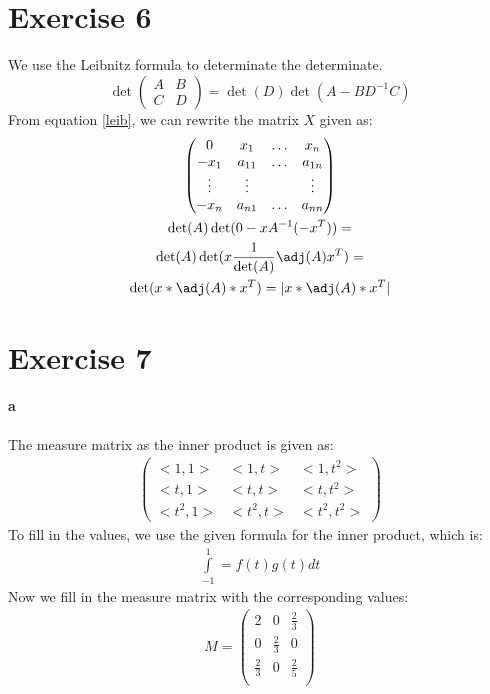 \section{Exercise 6}
We use the Leibnitz formula to determinate the determinate.
\begin{equation}
\label{leib}
\det\begin{pmatrix}A& B\\ C& D\end{pmatrix} = \det(D) \det(A - B D^{-1} C)
\end{equation}
From equation \ref{leib}, we can rewrite the matrix $X$ given as:
\begin{gather*}
\begin{pmatrix}
0& x_1 & \hdots & x_n \\
-x_1 & a_{11} & \hdots & a_{1n}\\
\vdots & \vdots	& & \vdots\\
-x_n & a_{n1} & \hdots & a_{nn} 
\end{pmatrix}  \\
\det(A) \det(0 - x A^{-1} (-x^T)) =\\
\det(A) \det( x \frac{1}{\det(A)} \adj(A) x^T) =\\
\det(x*\adj(A)*x^{T}) = | x*\adj(A)*x^{T} |
\end{gather*}

\section{Exercise 7}
\paragraph*{a}
The measure matrix as the inner product is given as: 
\begin{gather*}
\left( \begin{array}{ccc}
<1,1> & <1,t> & <1,t^2> \\
<t,1> & <t,t> & <t,t^2>\\
<t^2,1> & <t^2,t> & <t^2,t^2>
\end{array} \right)
\end{gather*}
To fill in the values, we use the given formula for the inner product, which is:
\begin{gather*}
\int\limits_{-1}^{1} = f(t)g(t) dt
\end{gather*}
Now we fill in the measure matrix with the corresponding values:
\begin{gather}
\label{measure}
M = \left( \begin{array}{ccc}
2 & 0 & \frac{2}{3} \\
0 & \frac{2}{3} & 0 \\
\frac{2}{3} & 0 & \frac{2}{5}\\
\end{array} \right)
\end{gather}

